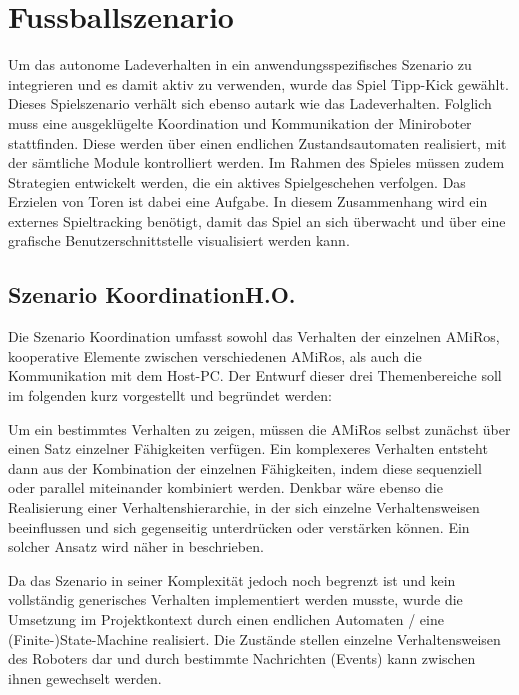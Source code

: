 \chapter[Fussballszenario]{Fussballszenario \hfill{}} \label{kap:Fussballszenario} %
Um das autonome Ladeverhalten in ein anwendungsspezifisches Szenario zu integrieren und es damit aktiv zu verwenden, wurde das Spiel Tipp-Kick gewählt. Dieses Spielszenario verhält sich ebenso autark wie das Ladeverhalten. Folglich muss eine ausgeklügelte Koordination und Kommunikation der Miniroboter stattfinden. Diese werden über einen endlichen Zustandsautomaten realisiert, mit der sämtliche Module kontrolliert werden. Im Rahmen des Spieles müssen zudem Strategien entwickelt werden, die ein aktives Spielgeschehen verfolgen. Das Erzielen von Toren ist dabei eine Aufgabe. In diesem Zusammenhang wird ein externes Spieltracking benötigt, damit das Spiel an sich überwacht und über eine grafische Benutzerschnittstelle visualisiert werden kann.

\section[Szenario Koordination]{Szenario Koordination\hfill {\normalsize H.O.}} \label{sec:szenario_koordination}

Die Szenario Koordination umfasst sowohl das Verhalten der einzelnen AMiRos, kooperative Elemente zwischen verschiedenen AMiRos, als auch die Kommunikation mit dem Host-PC. Der Entwurf dieser drei Themenbereiche soll im folgenden kurz vorgestellt und begründet werden:

Um ein bestimmtes Verhalten zu zeigen, müssen die AMiRos selbst zunächst über einen Satz einzelner Fähigkeiten verfügen. Ein komplexeres Verhalten entsteht dann aus der Kombination der einzelnen Fähigkeiten, indem diese sequenziell oder parallel miteinander kombiniert werden. Denkbar wäre ebenso die Realisierung einer Verhaltenshierarchie, in der sich einzelne Verhaltensweisen beeinflussen und sich gegenseitig unterdrücken oder verstärken können. Ein solcher Ansatz wird näher in \cite{Brooks:1986} beschrieben.

Da das Szenario in seiner Komplexität jedoch noch begrenzt ist und kein vollständig generisches Verhalten implementiert werden musste, wurde die Umsetzung im Projektkontext durch einen endlichen Automaten / eine (Finite-)State-Machine realisiert. Die Zustände stellen einzelne Verhaltensweisen des Roboters dar und durch bestimmte Nachrichten (Events) kann zwischen ihnen gewechselt werden.

